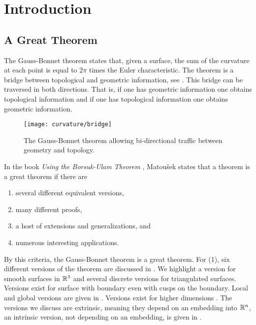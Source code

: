 \section{Introduction}
\label{sec:intro}

\subsection{A Great Theorem}
The Gauss-Bonnet theorem states that, given a surface, the sum of the curvature
at each point is equal to $2\pi$ times the Euler characteristic.
The theorem is a bridge between topological
and geometric information, see . 
This bridge can be traversed in both directions.
That is, if one has geometric information one obtains topological information and
if one has topological information one obtains geometric information.


\begin{figure}[htb]
\centering
\texttt{[image: curvature/bridge]}
\caption{The Gauss-Bonnet theorem allowing bi-directional traffic
between geometry and topology.}
\label{fig:bridge}
\end{figure}

In the book \emph{Using the Borsuk-Ulam Theorem}
\cite{jm08},
Matou\v{s}ek states that a theorem is a great theorem if there are
\begin{enumerate}[(1)]
\item several different equivalent versions,
\item many different proofs,
\item a host of extensions and generalizations, and
\item numerous interesting applications.
\end{enumerate}

By this criteria, the Gauss-Bonnet theorem is a great theorem.
For (1), six different versions of the theorem are discussed
in \cite{wu_historical_2008}. 
We highlight a version for smooth surfaces in $\mathbb{R}^3$ and
 several discrete versions for triangulated surfaces. 
 Versions exist for surface with boundary even with cusps on
 the boundary.
 Local and global versions are given in \cite{doc76}.
Versions exist for higher dimensions \cite{guillemin_differential_2010}.
The versions we discuss are extrinsic, meaning they depend on an embedding
into $\mathbb{R}^n$, an intrinsic version, not depending on an embedding,
 is given in \cite{chern_simple_1944}.
 
